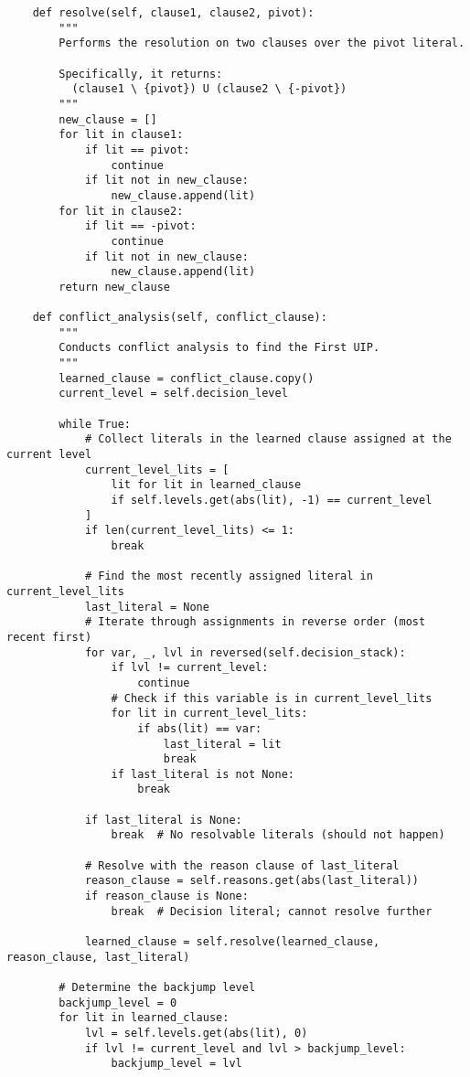 \begin{lstlisting}
    def resolve(self, clause1, clause2, pivot):
        """
        Performs the resolution on two clauses over the pivot literal.
        
        Specifically, it returns:
          (clause1 \ {pivot}) U (clause2 \ {-pivot})
        """
        new_clause = []
        for lit in clause1:
            if lit == pivot:
                continue
            if lit not in new_clause:
                new_clause.append(lit)
        for lit in clause2:
            if lit == -pivot:
                continue
            if lit not in new_clause:
                new_clause.append(lit)
        return new_clause

    def conflict_analysis(self, conflict_clause): 
        """
        Conducts conflict analysis to find the First UIP.
        """
        learned_clause = conflict_clause.copy()
        current_level = self.decision_level

        while True:
            # Collect literals in the learned clause assigned at the current level
            current_level_lits = [
                lit for lit in learned_clause 
                if self.levels.get(abs(lit), -1) == current_level
            ]
            if len(current_level_lits) <= 1:
                break

            # Find the most recently assigned literal in current_level_lits
            last_literal = None
            # Iterate through assignments in reverse order (most recent first)
            for var, _, lvl in reversed(self.decision_stack):
                if lvl != current_level:
                    continue
                # Check if this variable is in current_level_lits
                for lit in current_level_lits:
                    if abs(lit) == var:
                        last_literal = lit
                        break
                if last_literal is not None:
                    break

            if last_literal is None:
                break  # No resolvable literals (should not happen)

            # Resolve with the reason clause of last_literal
            reason_clause = self.reasons.get(abs(last_literal))
            if reason_clause is None:
                break  # Decision literal; cannot resolve further

            learned_clause = self.resolve(learned_clause, reason_clause, last_literal)

        # Determine the backjump level
        backjump_level = 0
        for lit in learned_clause:
            lvl = self.levels.get(abs(lit), 0)
            if lvl != current_level and lvl > backjump_level:
                backjump_level = lvl


\end{lstlisting}
